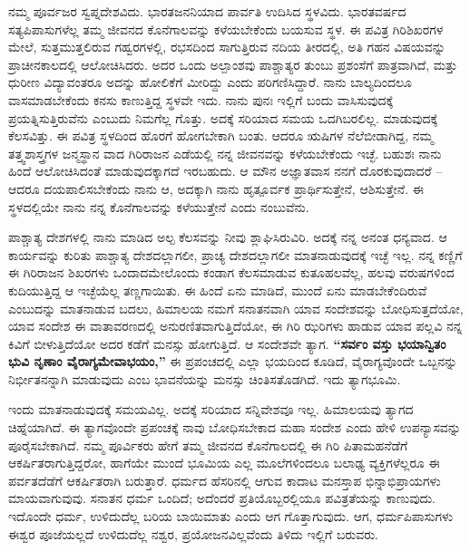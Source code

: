 \vskip 5pt

ನಮ್ಮ ಪೂರ್ವಜರ ಸ್ವಪ್ನದೇಶವಿದು. ಭಾರತಜನನಿಯಾದ ಪಾರ್ವತಿ ಉದಿಸಿದ ಸ್ಥಳವಿದು. ಭಾರತವರ್ಷದ ಸತ್ಯಪಿಪಾಸುಗಳೆಲ್ಲ ತಮ್ಮ ಜೀವನದ ಕೊನೆಗಾಲವನ್ನು ಕಳೆಯಬೇಕೆಂದು ಬಯಸುವ ಸ್ಥಳ. ಈ ಪವಿತ್ರ ಗಿರಿಶಿಖರಗಳ ಮೇಲೆ, ಸುತ್ತಮುತ್ತಲಿರುವ ಗಹ್ವರಗಳಲ್ಲಿ, ರಭಸದಿಂದ ಸಾಗುತ್ತಿರುವ ನದಿಯ ತೀರದಲ್ಲಿ, ಅತಿ ಗಹನ ವಿಷಯವನ್ನು ಪ್ರಾಚೀನಕಾಲದಲ್ಲಿ ಆಲೋಚಿಸಿದರು. ಅದರ ಒಂದು ಅಲ್ಪಾಂಶವು ಪಾಶ್ಚಾತ್ಯರ ತುಂಬು ಪ್ರಶಂಸೆಗೆ ಪಾತ್ರವಾಗಿದೆ, ಮತ್ತು ಧುರೀಣ ವಿದ್ಯಾವಂತರೂ ಅದನ್ನು ಹೋಲಿಕೆಗೆ ಮೀರಿದ್ದು ಎಂದು ಪರಿಗಣಿಸಿದ್ದಾರೆ. ನಾನು ಬಾಲ್ಯದಿಂದಲೂ ವಾಸಮಾಡಬೇಕೆಂದು ಕನಸು ಕಾಣುತ್ತಿದ್ದ ಸ್ಥಳವೇ ಇದು. ನಾನು ಪುನಃ ಇಲ್ಲಿಗೆ ಬಂದು ವಾಸಿಸುವುದಕ್ಕೆ ಪ್ರಯತ್ನಿಸುತ್ತಿರುವೆನು ಎಂಬುದು ನಿಮಗೆಲ್ಲ ಗೊತ್ತು. ಅದಕ್ಕೆ ಸರಿಯಾದ ಸಮಯ ಒದಗಿಬರಲಿಲ್ಲ. ಮಾಡುವುದಕ್ಕೆ ಕೆಲಸವಿತ್ತು. ಈ ಪವಿತ್ರ ಸ್ಥಳದಿಂದ ಹೊರಗೆ ಹೋಗಬೇಕಾಗಿ ಬಂತು. ಆದರೂ ಋಷಿಗಳ ನೆಲೆಬೀಡಾಗಿದ್ದ, ನಮ್ಮ ತತ್ತ್ವಶಾಸ್ತ್ರಗಳ ಜನ್ಮಸ್ಥಾನ ವಾದ ಗಿರಿರಾಜನ ಎಡೆಯಲ್ಲಿ ನನ್ನ ಜೀವನವನ್ನು ಕಳೆಯಬೇಕೆಂದು ಇಚ್ಛೆ. ಬಹುಶಃ ನಾನು ಹಿಂದೆ ಆಲೋಚಿಸಿದಂತೆ ಮಾಡುವುದಕ್ಕಾಗದೆ ಇರಬಹುದು. ಆ ಮೌನ ಅಜ್ಞಾತವಾಸ ನನಗೆ ದೊರಕುವುದಾದರೆ – ಆದರೂ ದಯಪಾಲಿಸಬೇಕೆಂದು ನಾನು ಆ, ಅದಕ್ಕಾಗಿ ನಾನು ಹೃತ್ಪೂರ್ವಕ ಪ್ರಾರ್ಥಿಸುತ್ತೇನೆ, ಆಶಿಸುತ್ತೇನೆ. ಈ ಸ್ಥಳದಲ್ಲಿಯೇ ನಾನು ನನ್ನ ಕೊನೆಗಾಲವನ್ನು ಕಳೆಯುತ್ತೇನೆ ಎಂದು ನಂಬುವೆನು.

\newpage

ಪಾಶ್ಚಾತ್ಯ ದೇಶಗಳಲ್ಲಿ ನಾನು ಮಾಡಿದ ಅಲ್ಪ ಕೆಲಸವನ್ನು ನೀವು ಶ್ಲಾಘಿಸಿರುವಿರಿ. ಅದಕ್ಕೆ ನನ್ನ ಅನಂತ ಧನ್ಯವಾದ. ಆ ಕಾರ್ಯವನ್ನು ಕುರಿತು ಪಾಶ್ಚಾತ್ಯ ದೇಶದಲ್ಲಾಗಲೀ, ಪ್ರಾಚ್ಯ ದೇಶದಲ್ಲಾಗಲೀ ಮಾತನಾಡುವುದಕ್ಕೆ ಇಚ್ಛೆ ಇಲ್ಲ. ನನ್ನ ಕಣ್ಣಿಗೆ ಈ ಗಿರಿರಾಜನ ಶಿಖರಗಳು ಒಂದಾದಮೇಲೊಂದು ಕಂಡಾಗ ಕೆಲಸಮಾಡುವ ಕುತೂಹಲವೆಲ್ಲ, ಹಲವು ವರುಷಗಳಿಂದ ಕುದಿಯುತ್ತಿದ್ದ ಆ ಇಚ್ಛೆಯೆಲ್ಲ ತಣ್ಣಗಾಯಿತು. ಈ ಹಿಂದೆ ಏನು ಮಾಡಿದೆ, ಮುಂದೆ ಏನು ಮಾಡಬೇಕೆಂದಿರುವೆ ಎಂಬುದನ್ನು ಮಾತನಾಡುವ ಬದಲು, ಹಿಮಾಲಯ ನಮಗೆ ಸನಾತನವಾಗಿ ಯಾವ ಸಂದೇಶವನ್ನು ಬೋಧಿಸುತ್ತದೆಯೋ, ಯಾವ ಸಂದೇಶ ಈ ವಾತಾವರಣದಲ್ಲಿ ಅನುರಣಿತವಾಗುತ್ತಿದೆಯೋ, ಈ ಗಿರಿ ಝರಿಗಳು ಹಾಡುವ ಯಾವ ಪಲ್ಲವಿ ನನ್ನ ಕಿವಿಗೆ ಬೀಳುತ್ತಿದೆಯೋ ಅದರ ಕಡೆಗೆ ಮನಸ್ಸು ಹೋಗುತ್ತಿದೆ. ಆ ಸಂದೇಶವೇ ತ್ಯಾಗ. \textbf{“ಸರ್ವಂ ವಸ್ತು ಭಯಾನ್ವಿತಂ ಭುವಿ ನೃಣಾಂ ವೈರಾಗ್ಯಮೇವಾಭಯಂ,”} ಈ ಪ್ರಪಂಚದಲ್ಲಿ ಎಲ್ಲಾ ಭಯದಿಂದ ಕೂಡಿದೆ, ವೈರಾಗ್ಯವೊಂದೇ ಒಬ್ಬನನ್ನು ನಿರ್ಭೀತನನ್ನಾಗಿ ಮಾಡುವುದು ಎಂಬ ಭಾವನೆಯನ್ನು ಮನಸ್ಸು ಚಿಂತಿಸತೊಡಗಿದೆ. ಇದು ತ್ಯಾಗಭೂಮಿ.

\vskip 5pt

ಇಂದು ಮಾತನಾಡುವುದಕ್ಕೆ ಸಮಯವಿಲ್ಲ. ಅದಕ್ಕೆ ಸರಿಯಾದ ಸನ್ನಿವೇಶವೂ ಇಲ್ಲ. ಹಿಮಾಲಯವು ತ್ಯಾಗದ ಚಿಹ್ನೆಯಾಗಿದೆ. ಈ ತ್ಯಾಗವೊಂದೇ ಪ್ರಪಂಚಕ್ಕೆ ನಾವು ಬೋಧಿಸಬೇಕಾದ ಮಹಾ ಸಂದೇಶ ಎಂದು ಹೇಳಿ ಉಪನ್ಯಾಸವನ್ನು ಪೂರೈಸಬೇಕಾಗಿದೆ. ನಮ್ಮ ಪೂರ್ವಿಕರು ಹೇಗೆ ತಮ್ಮ ಜೀವನದ ಕೊನೆಗಾಲದಲ್ಲಿ ಈ ಗಿರಿ ಪಿತಾಮಹನೆಡೆಗೆ ಆಕರ್ಷಿತರಾಗುತ್ತಿದ್ದರೋ, ಹಾಗೆಯೇ ಮುಂದೆ ಭೂಮಿಯ ಎಲ್ಲ ಮೂಲೆಗಳಿಂದಲೂ ಬಲಾಢ್ಯ ವ್ಯಕ್ತಿಗಳೆಲ್ಲರೂ ಈ ಪರ್ವತದೆಡೆಗೆ ಆಕರ್ಷಿತರಾಗಿ ಬರುತ್ತಾರೆ. ಧರ್ಮದ ಹೆಸರಿನಲ್ಲಿ ಆಗುವ ಕಾದಾಟ ಮನಸ್ತಾಪ ಭಿನ್ನಾಭಿಪ್ರಾಯಗಳು ಮಾಯವಾಗುವುವು. ಸನಾತನ ಧರ್ಮ ಒಂದಿದೆ; ಅದೆಂದರೆ ಪ್ರತಿಯೊಬ್ಬರಲ್ಲಿಯೂ ಪವಿತ್ರತೆಯನ್ನು ಕಾಣುವುದು. ಇದೊಂದೇ ಧರ್ಮ, ಉಳಿದುದೆಲ್ಲ ಬರಿಯ ಬಾಯಿಮಾತು ಎಂದು ಆಗ ಗೊತ್ತಾಗುವುದು. ಆಗ, ಧರ್ಮಪಿಪಾಸುಗಳು ಈಶ್ವರ ಪೂಜೆಯಲ್ಲದೆ ಉಳಿದುದೆಲ್ಲ ನಶ್ವರ, ಪ್ರಯೋಜನವಿಲ್ಲವೆಂದು ತಿಳಿದು ಇಲ್ಲಿಗೆ ಬರುವರು.

